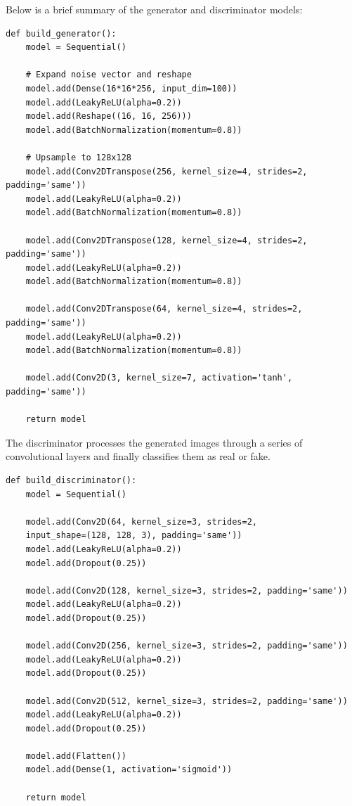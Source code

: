 Below is a brief summary of the generator and discriminator models:

\begin{verbatim}
def build_generator():
    model = Sequential()

    # Expand noise vector and reshape
    model.add(Dense(16*16*256, input_dim=100))
    model.add(LeakyReLU(alpha=0.2))
    model.add(Reshape((16, 16, 256)))
    model.add(BatchNormalization(momentum=0.8))

    # Upsample to 128x128
    model.add(Conv2DTranspose(256, kernel_size=4, strides=2, padding='same'))
    model.add(LeakyReLU(alpha=0.2))
    model.add(BatchNormalization(momentum=0.8))

    model.add(Conv2DTranspose(128, kernel_size=4, strides=2, padding='same'))
    model.add(LeakyReLU(alpha=0.2))
    model.add(BatchNormalization(momentum=0.8))

    model.add(Conv2DTranspose(64, kernel_size=4, strides=2, padding='same'))
    model.add(LeakyReLU(alpha=0.2))
    model.add(BatchNormalization(momentum=0.8))

    model.add(Conv2D(3, kernel_size=7, activation='tanh', padding='same'))

    return model
\end{verbatim}

The discriminator processes the generated images through a series of convolutional layers and finally classifies them as real or fake.

\begin{verbatim}
def build_discriminator():
    model = Sequential()

    model.add(Conv2D(64, kernel_size=3, strides=2, 
    input_shape=(128, 128, 3), padding='same'))
    model.add(LeakyReLU(alpha=0.2))
    model.add(Dropout(0.25))

    model.add(Conv2D(128, kernel_size=3, strides=2, padding='same'))
    model.add(LeakyReLU(alpha=0.2))
    model.add(Dropout(0.25))

    model.add(Conv2D(256, kernel_size=3, strides=2, padding='same'))
    model.add(LeakyReLU(alpha=0.2))
    model.add(Dropout(0.25))

    model.add(Conv2D(512, kernel_size=3, strides=2, padding='same'))
    model.add(LeakyReLU(alpha=0.2))
    model.add(Dropout(0.25))

    model.add(Flatten())
    model.add(Dense(1, activation='sigmoid'))

    return model
\end{verbatim}

